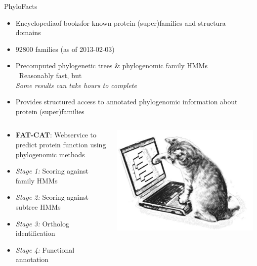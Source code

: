 \documentclass[14pt,xcolor=dvipsnames,pdftex]{beamer}
\begin{document}
\begin{frame}[allowframebreaks]{PhyloFacts}
 \begin{itemize}
  \item \glqq Encyclopedia\grqq of \glqq books\grqq for known protein (super)families and structura domains
  \item 92800 families (as of 2013-02-03)
  \item Precomputed phylogenetic trees \& phylogenomic family HMMs\\
  \textrightarrow\ Reasonably fast, but\\\glqq\textit{Some results can take hours to complete}\grqq
  \item Provides structured access to annotated phylogenomic information about protein (super)families
 \end{itemize}
 \framebreak
 \begin{columns}[T]
 \begin{column}{.7\textwidth}
 \begin{itemize}
  \item \textbf{FAT-CAT}: Webservice to predict protein function using phylogenomic methods
  \item \textit{Stage 1:} Scoring against family HMMs
  \item \textit{Stage 2:} Scoring against subtree HMMs
  \item \textit{Stage 3:} Ortholog identification
  \item \textit{Stage 4:} Functional annotation
 \end{itemize}
 \end{column}
  \begin{column}{.3\textwidth}
   \includegraphics[width=1.2\textwidth]{figures/fatcat.jpg}
  \end{column}
 \end{columns}
\end{frame}
\end{document}
